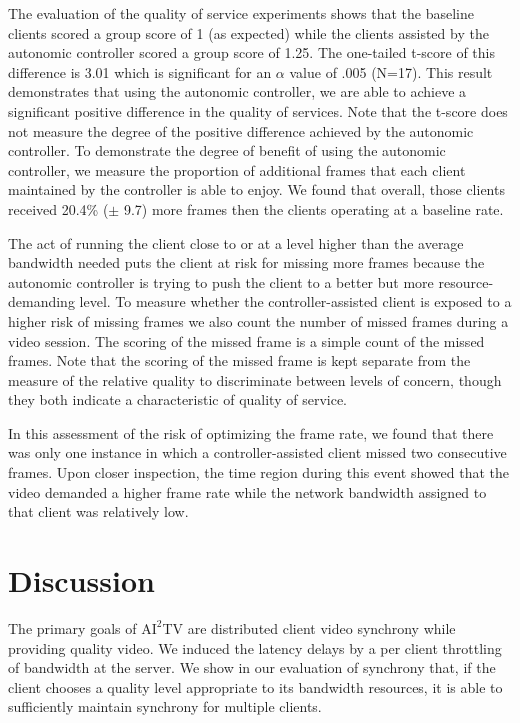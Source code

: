\documentclass{sig-alternate}
\begin{document}
The evaluation of the quality of service experiments shows that the
baseline clients scored a group score of 1 (as expected) while the
clients assisted by the autonomic controller scored a group score of
1.25.  The one-tailed t-score of this difference is 3.01 which is
significant for an $\alpha$ value of .005 (N=17).  This result
demonstrates that using the autonomic controller, we are able to
achieve a significant positive difference in the quality of services.
Note that the t-score does not measure the degree of the positive
difference achieved by the autonomic controller.  To demonstrate the
degree of benefit of using the autonomic controller, we measure the
proportion of additional frames that each client maintained by the
controller is able to enjoy.  We found that overall, those clients
received 20.4\% ($\pm$ 9.7) more frames then the clients operating at
a baseline rate.

The act of running the client close to or at a level higher than the
average bandwidth needed puts the client at risk for missing more
frames because the autonomic controller is trying to push the client
to a better but more resource-demanding level.  To measure whether the
controller-assisted client is exposed to a higher risk of missing
frames we also count the number of missed frames during a video
session.  The scoring of the missed frame is a simple count of the
missed frames.  Note that the scoring of the missed frame is kept
separate from the measure of the relative quality to discriminate
between levels of concern, though they both indicate a characteristic
of quality of service.

In this assessment of the risk of optimizing the frame rate, we found
that there was only one instance in which a controller-assisted client
missed two consecutive frames.  Upon closer inspection, the time
region during this event showed that the video demanded a higher frame
rate while the network bandwidth assigned to that client was
relatively low.


\section{Discussion} \label{discussion}
The primary goals of $\mathrm{AI}^2$TV are distributed client video
synchrony while providing quality video.  We induced the latency
delays by a per client throttling of bandwidth at the server.  We show
in our evaluation of synchrony that, if the client chooses a quality
level appropriate to its bandwidth resources, it is able to
sufficiently maintain synchrony for multiple clients.
\end{document}
